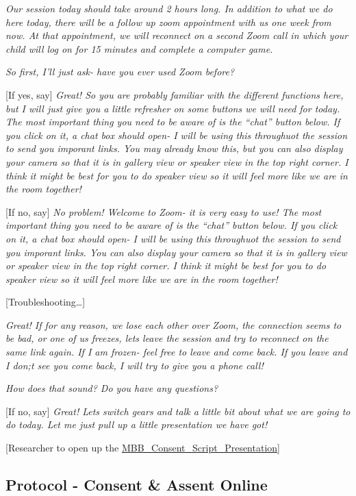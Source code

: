 \documentclass[]{book}
\begin{document}
\emph{Our session today should take around 2 hours long. In addition to what we do here today, there will be a follow up zoom appointment with us one week from now. At that appointment, we will reconnect on a second Zoom call in which your child will log on for 15 minutes and complete a computer game.}

\emph{So first, I'll just ask- have you ever used Zoom before?}

{[}If yes, say{]} \emph{Great! So you are probably familiar with the different functions here, but I will just give you a little refresher on some buttons we will need for today. The most important thing you need to be aware of is the ``chat'' button below. If you click on it, a chat box should open- I will be using this throughuot the session to send you imporant links. You may already know this, but you can also display your camera so that it is in gallery view or speaker view in the top right corner. I think it might be best for you to do speaker view so it will feel more like we are in the room together!}

{[}If no, say{]} \emph{No problem! Welcome to Zoom- it is very easy to use! The most important thing you need to be aware of is the ``chat'' button below. If you click on it, a chat box should open- I will be using this throughuot the session to send you imporant links. You can also display your camera so that it is in gallery view or speaker view in the top right corner. I think it might be best for you to do speaker view so it will feel more like we are in the room together!}

{[}Troubleshooting\ldots{}{]}

\emph{Great! If for any reason, we lose each other over Zoom, the connection seems to be bad, or one of us freezes, lets leave the session and try to reconnect on the same link again. If I am frozen- feel free to leave and come back. If you leave and I don;t see you come back, I will try to give you a phone call!}

\emph{How does that sound? Do you have any questions?}

{[}If no, say{]} \emph{Great! Lets switch gears and talk a little bit about what we are going to do today. Let me just pull up a little presentation we have got!}

{[}Researcher to open up the \href{https://ucla.app.box.com/file/729637683371?sb=/activity}{MBB\_Consent\_Script\_Presentation}{]}

\hypertarget{protocol---consent-assent-online}{%
\subsection{Protocol - Consent \& Assent Online}\label{protocol---consent-assent-online}}
\end{document}
